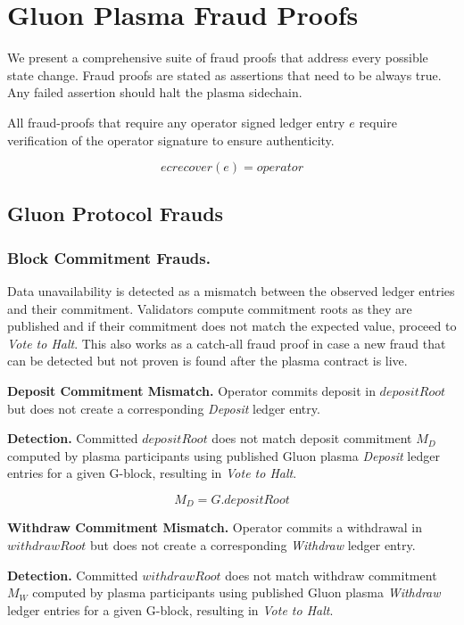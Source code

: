 \documentclass[12pt,a4paper]{article}
\begin{document}
\section{Gluon Plasma Fraud Proofs}

We present a comprehensive suite of fraud proofs that address every possible state change. Fraud proofs are stated as assertions that need to be always true. Any failed assertion should halt the plasma sidechain. 

All fraud-proofs that require any operator signed ledger entry $e$ require verification of the operator signature to ensure authenticity.

\begin{equation}
    ecrecover(e) = operator
\end{equation}

\subsection{Gluon Protocol Frauds}

\subsubsection{Block Commitment Frauds.}\label{fp:bcf}
Data unavailability is detected as a mismatch between the observed ledger entries and their commitment. Validators compute commitment roots as they are published and if their commitment does not match the expected value, proceed to \emph{Vote to Halt}. This also works as a catch-all fraud proof in case a new fraud that can be detected but not proven is found after the plasma contract is live.


\textbf{Deposit Commitment Mismatch.} Operator commits deposit in $depositRoot$ but does not create a corresponding \emph{Deposit} ledger entry.

\textbf{Detection.} 
Committed $depositRoot$ does not match deposit commitment $M_D$ computed by plasma participants using published Gluon plasma \emph{Deposit} ledger entries for a given G-block, resulting in \emph{Vote to Halt}.

\begin{equation}
M_D = G.depositRoot
\end{equation}

\textbf{Withdraw Commitment Mismatch.} 
Operator commits a withdrawal in $withdrawRoot$ but does not create a corresponding \emph{Withdraw} ledger entry.

\textbf{Detection.} 
Committed $withdrawRoot$ does not match withdraw commitment $M_W$ computed by plasma participants using published Gluon plasma \emph{Withdraw} ledger entries for a given G-block, resulting in \emph{Vote to Halt}.
\end{document}
